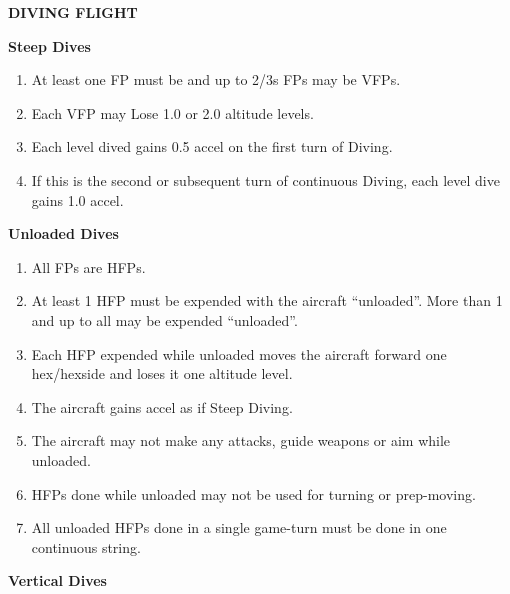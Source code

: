 \begin{table*}

\newcommand{\heading}[1]{\smallskip\textbf{\MakeUppercase{#1}}\par\smallskip}
\newcommand{\subheading}[1]{\smallskip\textbf{#1}\par\smallskip}

\medskip
\footnotesize
\begin{multicols}{2}

\heading{Diving Flight}

\subheading{Steep Dives}

\begin{enumerate}[nosep]
    \item At least one FP must be and up to 2/3s FPs may be VFPs.
    \item Each VFP may Lose 1.0 or 2.0 altitude levels.
    \item Each level dived gains 0.5 accel on the first turn of Diving.
    \item If this is the second or subsequent turn of continuous Diving, each level dive gains 1.0 accel.
\end{enumerate}

\subheading{Unloaded Dives}

\begin{enumerate}[nosep]
    \item All FPs are HFPs.
    \item At least 1 HFP must be expended with the aircraft “unloaded”. More than 1 and up to all may be expended “unloaded”.
    \item Each HFP expended while unloaded moves the aircraft forward one hex/hexside and loses it one altitude level.
    \item The aircraft gains accel as if Steep Diving.
    \item The aircraft may not make any attacks, guide weapons or aim while unloaded.
    \item HFPs done while unloaded may not be used for turning or prep-moving.
    \item All unloaded HFPs done in a single game-turn must be done in one continuous string.
\end{enumerate}

\subheading{Vertical Dives}


\end{multicols}
\end{table*}
